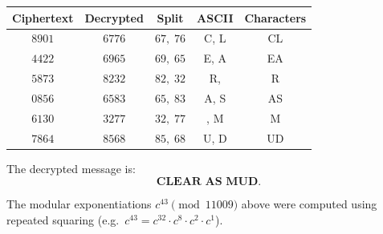 \begin{center}
\renewcommand{\arraystretch}{1.4}
\begin{tabular}{ccccc}
    \hline
    \textbf{Ciphertext} & \textbf{Decrypted} & \textbf{Split} & \textbf{ASCII} & \textbf{Characters} \\
    \hline
    $8901$ & $6776$ & $67,\;76$ & C, L & CL \\
    $4422$ & $6965$ & $69,\;65$ & E, A & EA \\
    $5873$ & $8232$ & $82,\;32$ & R, \textvisiblespace & R\textvisiblespace \\
    $0856$ & $6583$ & $65,\;83$ & A, S & AS \\
    $6130$ & $3277$ & $32,\;77$ & \textvisiblespace, M & \textvisiblespace M \\
    $7864$ & $8568$ & $85,\;68$ & U, D & UD \\
    \hline
\end{tabular}
\end{center}

\medskip
The decrypted message is:
\[
    \textbf{CLEAR AS MUD.}
\]

\begin{remark}
The modular exponentiations $c^{43} \pmod{11009}$ above were computed using
repeated squaring (e.g.\ $c^{43} = c^{32} \cdot c^8 \cdot c^2 \cdot c^1$).
\end{remark}
